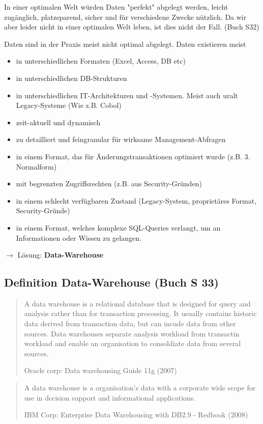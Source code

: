 \documentclass[a4paper, 11pt]{article}
\begin{document}
In einer optimalen Welt würden Daten "perfekt" abgelegt werden, leicht zugänglich, platzsparend, sicher und für verschiedene Zwecke nützlich. Da wir aber leider nicht in einer optimalen Welt leben, ist dies nicht der Fall. (Buch S32)

Daten sind in der Praxis meist nicht optimal abgelegt. Daten existieren meist
\begin{itemize}
	\item in unterschiedlichen Formaten (Excel, Access, DB etc)
	\item in unterschiedlichen DB-Strukturen 
	\item in unterschiedlichen IT-Architekturen und -Systemen. Meist auch uralt Legacy-Systeme (Wie z.B. Cobol)
	\item zeit-aktuell und dynamisch
	\item zu detailliert und feingranular für wirksame Management-Abfragen
	\item in einem Format, das für Änderungstransaktionen optimiert wurde (z.B. 3. Normalform)
	\item mit begrenzten Zugriffsrechten (z.B. aus Security-Gründen)
	\item in einem schlecht verfügbaren Zustand (Legacy-System, proprietäres Format, Security-Gründe)
	\item in einem Format, welches komplexe SQL-Queries verlangt, um an Informationen oder Wissen zu gelangen.
\end{itemize}

$\rightarrow$ Lösung: \textbf{Data-Warehouse}

\subsection{Definition Data-Warehouse (Buch S 33)}
	
\blockquote[Oracle corp: Data warehousing Guide 11g (2007)]{A data warehouse is a relational database that is designed for query and analysis rather than for transaction processing. It usually contains historic data derived from transaction data, but can incude data from other sources. Data warehouses separate analysis workload from transactin workload and enable an organisation to consoldiate data from several sources.} 
 

\blockquote[IBM Corp: Enterprise Data Warehousing with DB2.9 - Redbook (2008)]{A data warehouse is a organisation's data with a corporate wide scope for use in decision support and informational applications.}
\vspace*{10px}
\end{document}
